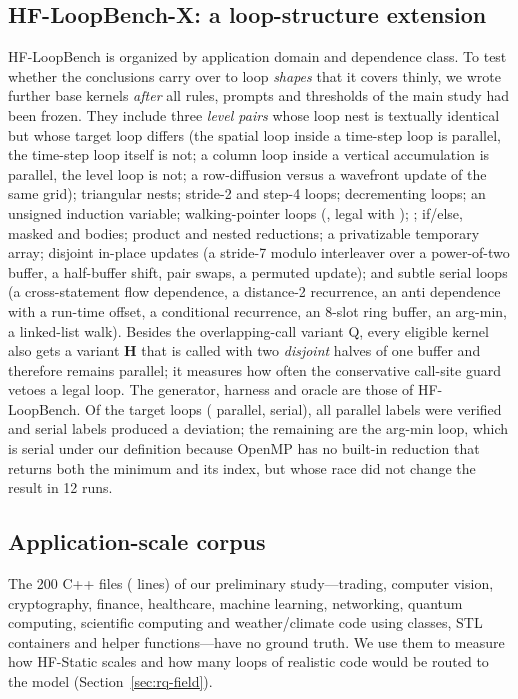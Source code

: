 \subsection{HF-LoopBench-X: a loop-structure extension}
\label{sec:benchx}
HF-LoopBench is organized by application domain and dependence class. To test whether the conclusions carry over to loop \emph{shapes} that it covers thinly, we wrote \xBases{} further base kernels \emph{after} all rules, prompts and thresholds of the main study had been frozen. They include three \emph{level pairs} whose loop nest is textually identical but whose target loop differs (the spatial loop inside a time-step loop is parallel, the time-step loop itself is not; a column loop inside a vertical accumulation is parallel, the level loop is not; a row-diffusion versus a wavefront update of the same grid); triangular nests; stride-2 and step-4 loops; decrementing loops; an unsigned induction variable; walking-pointer loops (, legal with ); ; if/else, masked and  bodies; product and nested reductions; a privatizable temporary array; disjoint in-place updates (a stride-7 modulo interleaver over a power-of-two buffer, a half-buffer shift, pair swaps, a permuted update); and subtle serial loops (a cross-statement flow dependence, a distance-2 recurrence, an anti dependence with a run-time offset, a conditional recurrence, an 8-slot ring buffer, an arg-min, a linked-list walk). Besides the overlapping-call variant Q, every eligible kernel also gets a variant \textbf{H} that is called with two \emph{disjoint} halves of one buffer and therefore remains parallel; it measures how often the conservative call-site guard vetoes a legal loop. The generator, harness and oracle are those of HF-LoopBench. Of the \xLoops{} target loops (\xPar{} parallel, \xSer{} serial), all \xVerified{} parallel labels were verified and \xManifested{} serial labels produced a deviation; the remaining \xNotManifested{} are the arg-min loop, which is serial under our definition because OpenMP has no built-in reduction that returns both the minimum and its index, but whose race did not change the result in 12 runs.

\subsection{Application-scale corpus}
The 200 C++ files (\fieldLines{} lines) of our preliminary study---trading, computer vision, cryptography, finance, healthcare, machine learning, networking, quantum computing, scientific computing and weather/climate code using classes, STL containers and helper functions---have no ground truth. We use them to measure how HF-Static scales and how many loops of realistic code would be routed to the model (Section~\ref{sec:rq-field}).
